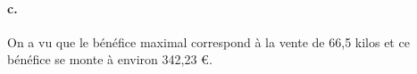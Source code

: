 \begin{center}
\end{center}

\paragraph{c.} On a vu que le bénéfice maximal correspond à la vente de 66{,}5 kilos et ce bénéfice se monte à environ 342{,}23 €.
